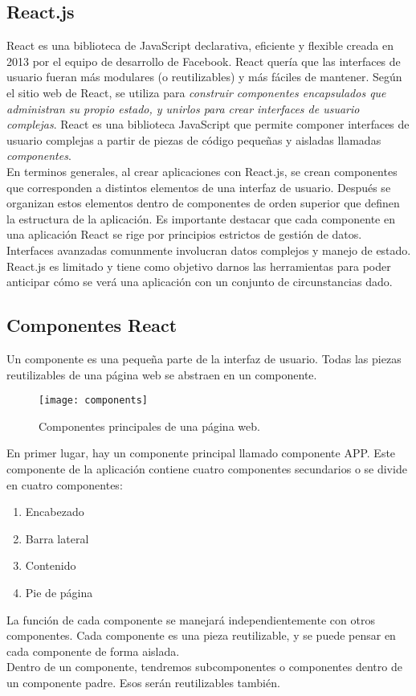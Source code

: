 

\subsection{React.js}
React es una biblioteca de JavaScript declarativa, eficiente y flexible creada en 2013 por el equipo de desarrollo de Facebook. React quería que las interfaces de usuario fueran más modulares (o reutilizables) y más fáciles de mantener. Según el sitio web de React, se utiliza para \textit{construir componentes encapsulados que administran su propio estado, y unirlos para crear interfaces de usuario complejas}. React es una biblioteca JavaScript que permite componer interfaces de usuario complejas a partir de piezas de código pequeñas y aisladas llamadas \textit{componentes}.\\[0.8cm]
En terminos generales, al crear aplicaciones con React.js, se crean componentes que corresponden a distintos elementos de una interfaz de usuario. Después se organizan estos elementos dentro de componentes de orden superior que definen la estructura de la aplicación. Es importante destacar que cada componente en una aplicación React se rige por principios estrictos de gestión de datos. Interfaces avanzadas comunmente involucran datos complejos y manejo de estado. React.js es limitado y tiene como objetivo darnos las herramientas para poder anticipar cómo se verá una aplicación con un conjunto de circunstancias dado.
\subsection{Componentes React}
Un componente es una pequeña parte de la interfaz de usuario. Todas las piezas reutilizables de una página web se abstraen en un componente.
\begin{figure}[H]
  \centering
  \texttt{[image: components]}
  \caption{Componentes principales de una página web.}
\end{figure}
En primer lugar, hay un componente principal llamado componente APP. Este componente de la aplicación contiene cuatro componentes secundarios o se divide en cuatro componentes:
\begin{enumerate}
  \item Encabezado
  \item Barra lateral
  \item Contenido
  \item Pie de página
\end{enumerate}
La función de cada componente se manejará independientemente con otros componentes. Cada componente es una pieza reutilizable, y se puede pensar en cada componente de forma aislada. \\[0.8cm]
Dentro de un componente, tendremos subcomponentes o componentes dentro de un componente padre. Esos serán reutilizables también. \\[0.8cm]

